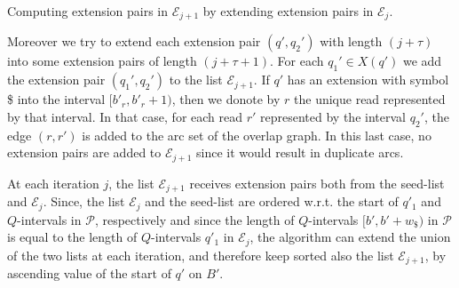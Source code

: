 \documentclass[runningheads,envcountsame,a4paper]{llncs}
\makeatletter
\newcommand{\paragrafo}{%
  \@startsection{paragraph}{4}{\z@ }{-7\p@ \@plus -4\p@ \@minus -4\p@
  }{-0.5em \@plus -0.22em \@minus -0.1em}{\normalfont \normalsize \itshape
  }
}
\newcommand{\notaestesa}[2]{%
 \marginpar{\color{red!75!black}\textbf{\texttimes}}%
 {\color{red!75!black}%
 [\,\textbullet\,\textsf{\textbf{#1:}} %
 \textsf{\footnotesize#2}\,\textbullet\,]}%
}
\newcommand{\ie}{\textit{i.e.}\xspace}
\makeatother
\begin{document}
\paragrafo{Computing  extension pairs in $\mathcal{E}_{j+1}$ by extending   extension pairs in $\mathcal{E}_{j}$.}

Moreover we try to extend each extension pair $(q', q_{2}')$ with length $(j+\tau)$ into some
extension pairs of length $(j+\tau+1)$.
For each $q_{1}'\in X(q')$ we add the extension pair  $(q_{1}',q_{2}')$ to
the list $\mathcal{E}_{j+1}$.
If  $q'$ has an  extension with symbol \$
into the interval $[b'_r, b'_r+1)$, then we donote by $r$ the unique  read represented by that
interval.
In that case, for   each read  $r'$ represented by the
interval $q_{2}'$, the edge $(r,r')$ is added to the arc set of the overlap graph.
In this last case, no extension pairs are added to $\mathcal{E}_{j+1}$ since it
would result in duplicate arcs.


At each iteration $j$, the list $\mathcal{E}_{j+1}$ receives extension
pairs both from the seed-list  and $\mathcal{E}_{j}$.
Since, the list  $\mathcal{E}_{j}$  and the seed-list are ordered w.r.t. the start of  $q'_1$ and $Q$-intervals in $\mathcal{P}$, respectively and since the  length of $Q$-intervals $[b', b'+w_\$)$ in $\mathcal{P}$ is
equal to the length  of  $Q$-intervals $q'_1$ in $\mathcal{E}_{j}$, the
algorithm can extend the union of the two lists at each iteration, and therefore keep
sorted also the list $\mathcal{E}_{j+1}$, by ascending value of the
start of $q'$ on $B'$.




\end{document}
